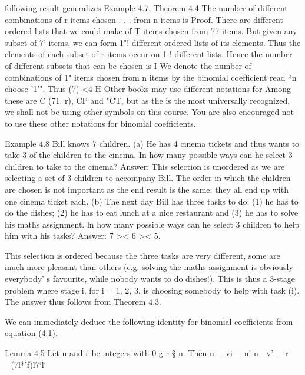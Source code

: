 \documentclass{beamer}
\begin{document}
\begin{frame}
\begin{frame}
following result generalizes Example 4.7.
Theorem 4.4 The number of different combinations of r items chosen
. . .
from n items is 
Proof. There are  different ordered lists that we could make of
T items chosen from 77 items. But given any subset of 7‘ items, we can
form 1"! different ordered lists of its elements. Thus the elements of
each subset of r items occur on 1-! different lists. Hence the number
of different subsets that can be chosen is  I
We denote the number of combinations of 1" items chosen from n
items by the binomial coefﬁcient  read “n choose '1'". Thus
(7)  <4-H
Other books may use different notations for  Among these are
C (71. r), CI‘ and "CT, but as the  is the most universally
recognized, we shall not be using other symbols on this course. You
are also encouraged not to use these other notations for binomial
coefﬁcients.
\end{frame}
\begin{frame}
Example 4.8 Bill knows 7 children.
(a) He has 4 cinema tickets and thus wants to take 3 of the children
to the cinema. In how many possible ways can he select 3
children to take to the cinema?
Answer: 
This selection is unordered as we are selecting a set of 3
children to accompany Bill. The order in which the children are
chosen is not important as the end result is the same: they all
end up with one cinema ticket each.
(b) The next day Bill has three tasks to do: (1) he has to do the
dishes; (2) he has to eat lunch at a nice restaurant and (3) he
has to solve his maths assignment. ln how many possible ways
can he select 3 children to help him with his tasks?
Answer: 7 >< 6 >< 5.
\end{frame}
\begin{frame}
This selection is ordered because the three tasks are very
different, some are much more pleasant than others (e.g.
solving the maths assignment is obviously everybody’ s favourite,
while nobody wants to do dishes!). This is thus a 3-stage
problem where stage i, for i = 1, 2, 3, is choosing somebody to
help with task (i). The answer thus follows from Theorem 4.3.
\end{frame}
\begin{frame}
We can immediately deduce the following identity for binomial
coefficients from equation (4.1).

Lemma 4.5 Let n and r be integers with 0 g r § n. Then
n _ vi _ n!
n—v' _ r _(7l*’f)l7‘l‘


\end{frame}
\end{frame}
\end{document}
